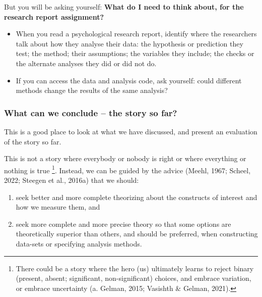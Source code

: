 \documentclass[
  letterpaper,
  DIV=11,
  numbers=noendperiod]{scrreprt}
\providecommand{\tightlist}{%
  \setlength{\itemsep}{0pt}\setlength{\parskip}{0pt}}\usepackage{longtable,booktabs,array}
\begin{document}
But you will be asking yourself: \textbf{What do I need to think about,
for the research report assignment?}

\begin{tcolorbox}[enhanced jigsaw, opacitybacktitle=0.6, title=\textcolor{quarto-callout-tip-color}{\faLightbulb}\hspace{0.5em}{Tip}, arc=.35mm, colbacktitle=quarto-callout-tip-color!10!white, colframe=quarto-callout-tip-color-frame, leftrule=.75mm, opacityback=0, breakable, titlerule=0mm, left=2mm, bottomrule=.15mm, toprule=.15mm, colback=white, coltitle=black, bottomtitle=1mm, toptitle=1mm, rightrule=.15mm]

\begin{itemize}
\tightlist
\item
  When you read a psychological research report, identify where the
  researchers talk about how they analyse their data: the hypothesis or
  prediction they test; the method; their assumptions; the variables
  they include; the checks or the alternate analyses they did or did not
  do.
\item
  If you can access the data and analysis code, ask yourself: could
  different methods change the results of the same analysis?
\end{itemize}

\end{tcolorbox}

\hypertarget{what-can-we-conclude-the-story-so-far}{%
\subsubsection{What can we conclude -- the story so
far?}\label{what-can-we-conclude-the-story-so-far}}

This is a good place to look at what we have discussed, and present an
evaluation of the story so far.

This is not a story where everybody or nobody is right or where
everything or nothing is true \footnote{There could be a story where the
  hero (us) ultimately learns to reject binary (present, absent;
  significant, non-significant) choices, and embrace variation, or
  embrace uncertainty (a. Gelman, 2015; Vasishth \& Gelman, 2021).}.
Instead, we can be guided by the advice (Meehl, 1967; Scheel, 2022;
Steegen et al., 2016a) that we should:

\begin{enumerate}
\def\labelenumi{\arabic{enumi}.}
\tightlist
\item
  seek better and more complete theorizing about the constructs of
  interest and how we measure them, and
\item
  seek more complete and more precise theory so that some options are
  theoretically superior than others, and should be preferred, when
  constructing data-sets or specifying analysis methods.
\end{enumerate}
\end{document}
